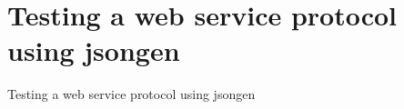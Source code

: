\section{Testing a web service protocol using jsongen}

\begin{frame}{Testing a web service protocol using jsongen}

\end{frame}